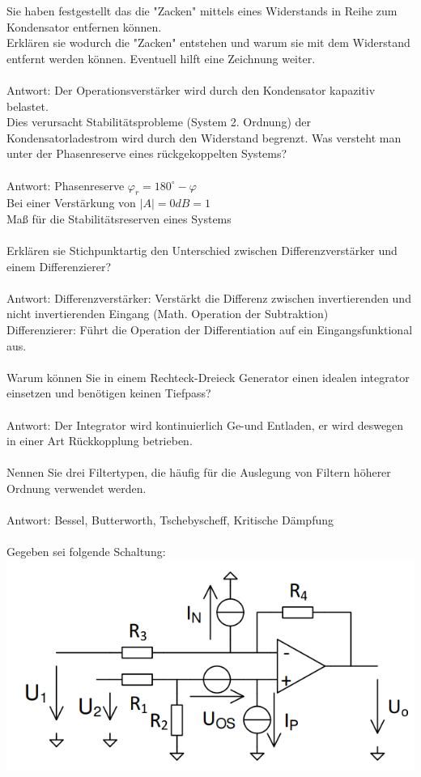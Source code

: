 \documentclass[A4]{scrartcl}
\begin{document}
  Sie haben festgestellt das die "Zacken" mittels eines Widerstands in Reihe zum Kondensator entfernen können.\\
  Erklären sie wodurch die "Zacken" entstehen und warum sie mit dem Widerstand entfernt werden können. Eventuell hilft eine Zeichnung weiter.\\
  \\
  Antwort: Der Operationsverstärker wird durch den Kondensator kapazitiv belastet.\\
  Dies verursacht Stabilitätsprobleme (System 2. Ordnung) der Kondensatorladestrom wird durch den Widerstand begrenzt. 
  Was versteht man unter der Phasenreserve eines rückgekoppelten Systems?\\
  \\
  Antwort: Phasenreserve $ \varphi_r = 180^\circ - \varphi$\\
  Bei einer Verstärkung von $|A|=0dB=1$\\
  Maß für die Stabilitätsreserven eines Systems\\\\
  Erklären sie Stichpunktartig den Unterschied zwischen Differenzverstärker und einem Differenzierer?\\
  \\
  Antwort:
  Differenzverstärker: Verstärkt die Differenz zwischen invertierenden und nicht invertierenden Eingang (Math. Operation der Subtraktion)\\
  Differenzierer: Führt die Operation der Differentiation auf ein Eingangsfunktional aus.\\\\
  Warum können Sie in einem Rechteck-Dreieck Generator einen idealen integrator einsetzen und benötigen keinen Tiefpass?\\
  \\
  Antwort: Der Integrator wird kontinuierlich Ge-und Entladen, er wird deswegen in einer Art Rückkopplung betrieben.\\\\
  Nennen Sie drei Filtertypen, die häufig für die Auslegung von Filtern höherer Ordnung verwendet werden.\\
  \\
  Antwort: Bessel, Butterworth, Tschebyscheff, Kritische Dämpfung\\\\
  Gegeben sei folgende Schaltung:\\
  \includegraphics{Schaltung1.png}\\
\end{document}
